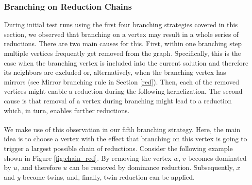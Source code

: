 \documentclass[12pt,a4paper,twoside]{scrartcl}
\numberwithin{equation}{section}
\begin{document}
\subsubsection{Branching on Reduction Chains}
During initial test runs using the first four branching strategies covered in this section, we observed that branching on a vertex may result in a whole series of reductions. There are two main causes for this. First, within one branching step multiple vertices frequently get removed from the graph. Specifically, this is the case when the branching vertex is included into the current solution and therefore its neighbors are excluded or, alternatively, when the branching vertex has mirrors (see Mirror branching rule in Section \ref{red}). Then, each of the removed vertices might enable a reduction during the following kernelization. The second cause is that removal of a vertex during branching might lead to a reduction which, in turn, enables further reductions. 
\paragraph{}
We make use of this observation in our fifth branching strategy. Here, the main idea is to choose a vertex with the effect that branching on this vertex is going to trigger a largest possible chain of reductions. Consider the following example shown in Figure \ref{fig:chain_red}. By removing the vertex $w$, $v$ becomes dominated by $u$, and therefore $u$ can be removed by dominance reduction. Subsequently, $x$ and $y$ become twins, and, finally, twin reduction can be applied.
\end{document}
